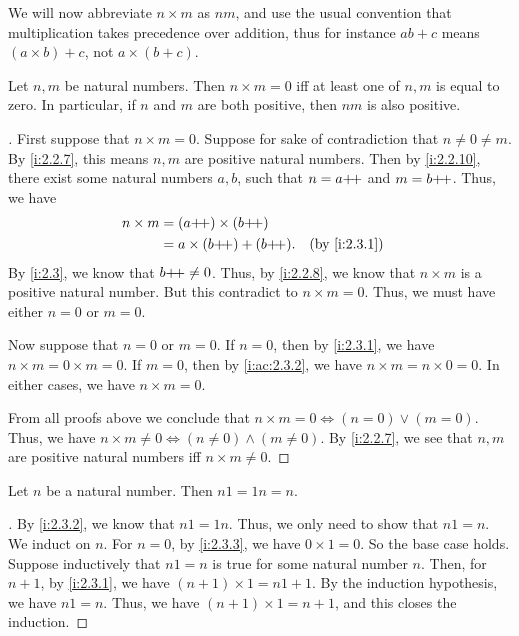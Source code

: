 \begin{note}
  We will now abbreviate \(n \times m\) as \(nm\), and use the usual convention that multiplication takes precedence over addition, thus for instance \(ab + c\) means \((a \times b) + c\), not \(a \times (b + c)\).
\end{note}

\begin{lem}\label{i:2.3.3}
  Let \(n, m\) be natural numbers.
  Then \(n \times m = 0\) iff at least one of \(n, m\) is equal to zero.
  In particular, if \(n\) and \(m\) are both positive, then \(nm\) is also positive.
\end{lem}

\begin{proof}[]
  First suppose that \(n \times m = 0\).
  Suppose for sake of contradiction that \(n \neq 0 \neq m\).
  By \cref{i:2.2.7}, this means \(n, m\) are positive natural numbers.
  Then by \cref{i:2.2.10}, there exist some natural numbers \(a, b\), such that \(n = a{+}\!{+}\) and \(m = b{+}\!{+}\).
  Thus, we have
  \begin{align*}
    n \times m & = (a\pp) \times (b\pp)                        \\
               & = a \times (b\pp) + (b\pp). &  & \by{i:2.3.1}
  \end{align*}
  By \cref{i:2.3}, we know that \(b{+}\!{+} \neq 0\).
  Thus, by \cref{i:2.2.8}, we know that \(n \times m\) is a positive natural number.
  But this contradict to \(n \times m = 0\).
  Thus, we must have either \(n = 0\) or \(m = 0\).

  Now suppose that \(n = 0\) or \(m = 0\).
  If \(n = 0\), then by \cref{i:2.3.1}, we have \(n \times m = 0 \times m = 0\).
  If \(m = 0\), then by \cref{i:ac:2.3.2}, we have \(n \times m = n \times 0 = 0\).
  In either cases, we have \(n \times m = 0\).

  From all proofs above we conclude that \(n \times m = 0 \iff (n = 0) \lor (m = 0)\).
  Thus, we have \(n \times m \neq 0 \iff (n \neq 0) \land (m \neq 0)\).
  By \cref{i:2.2.7}, we see that \(n, m\) are positive natural numbers iff \(n \times m \neq 0\).
\end{proof}

\begin{ac}\label{i:ac:2.3.4}
  Let \(n\) be a natural number.
  Then \(n1 = 1n = n\).
\end{ac}

\begin{proof}[]
  By \cref{i:2.3.2}, we know that \(n1 = 1n\).
  Thus, we only need to show that \(n1 = n\).
  We induct on \(n\).
  For \(n = 0\), by \cref{i:2.3.3}, we have \(0 \times 1 = 0\).
  So the base case holds.
  Suppose inductively that \(n1 = n\) is true for some natural number \(n\).
  Then, for \(n + 1\), by \cref{i:2.3.1}, we have \((n + 1) \times 1 = n1 + 1\).
  By the induction hypothesis, we have \(n1 = n\).
  Thus, we have \((n + 1) \times 1 = n + 1\), and this closes the induction.
\end{proof}

